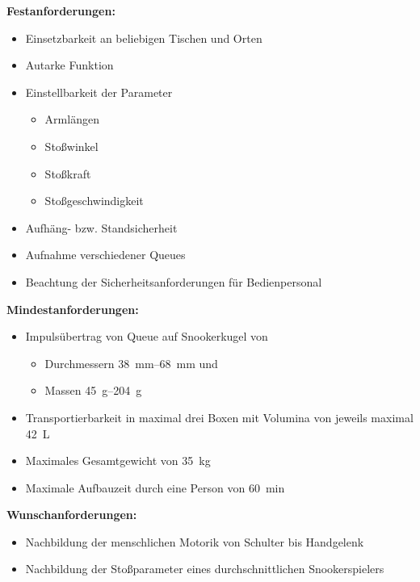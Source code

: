 		\textbf{Festanforderungen:}
		\begin{itemize}
			\item Einsetzbarkeit an beliebigen Tischen und Orten
			\item Autarke Funktion
			\item Einstellbarkeit der Parameter
			\begin{itemize}
				\item Armlängen
				\item Stoßwinkel
				\item Stoßkraft
				\item Stoßgeschwindigkeit
			\end{itemize}
			\item Aufhäng- bzw. Standsicherheit
			\item Aufnahme verschiedener Queues
			\item Beachtung der Sicherheitsanforderungen für Bedienpersonal
		\end{itemize}

		\textbf{Mindestanforderungen:}
		\begin{itemize}
			\item Impulsübertrag von Queue auf Snookerkugel von
			\begin{itemize}
				\item Durchmessern \SIrange{38}{68}{\milli\metre} und
				\item Massen \SIrange{45}{204}{\gram}
			\end{itemize}
			\item Transportierbarkeit in maximal drei Boxen mit Volumina von jeweils maximal \SI{42}{L}
			\item Maximales Gesamtgewicht von \SI{35}{\kilo\gram}
			\item Maximale Aufbauzeit durch eine Person von \SI{60}{\minute}
		\end{itemize}

		\textbf{Wunschanforderungen:}
		\begin{itemize}
			\item Nachbildung der menschlichen Motorik von Schulter bis Handgelenk
			\item Nachbildung der Stoßparameter eines durchschnittlichen Snookerspielers
		\end{itemize}
